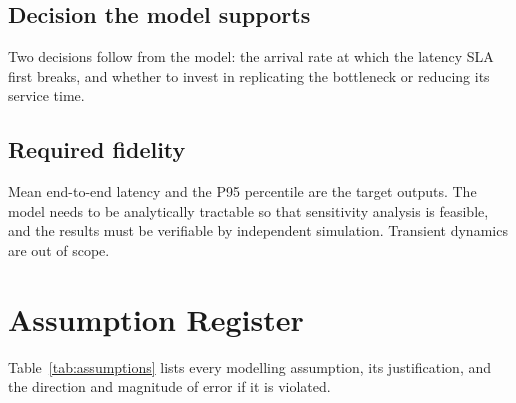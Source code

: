 \documentclass[12pt,a4paper]{article}
\begin{document}
\subsection{Decision the model supports}

Two decisions follow from the model: the arrival rate at which the latency SLA first
breaks, and whether to invest in replicating the bottleneck or reducing its service time.

\subsection{Required fidelity}

Mean end-to-end latency and the P95 percentile are the target outputs. The model needs
to be analytically tractable so that sensitivity analysis is feasible, and the results
must be verifiable by independent simulation. Transient dynamics are out of scope.

\section{Assumption Register}
\label{sec:assumptions}

Table~\ref{tab:assumptions} lists every modelling assumption, its justification, and the
direction and magnitude of error if it is violated.
\end{document}
